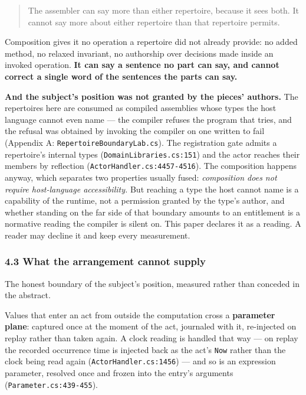 \documentclass[
]{article}
\begin{document}
\begin{quote}
The assembler can say more than either repertoire, because it sees both.
It cannot say more about either repertoire than that repertoire permits.
\end{quote}

Composition gives it no operation a repertoire did not already provide:
no added method, no relaxed invariant, no authorship over decisions made
inside an invoked operation. \textbf{It can say a sentence no part can
say, and cannot correct a single word of the sentences the parts can
say.}

\textbf{And the subject's position was not granted by the pieces'
authors.} The repertoires here are consumed as compiled assemblies whose
types the host language cannot even name --- the compiler refuses the
program that tries, and the refusal was obtained by invoking the
compiler on one written to fail (Appendix A:
\texttt{RepertoireBoundaryLab.cs}). The registration gate admits a
repertoire's internal types (\texttt{DomainLibraries.cs:151}) and the
actor reaches their members by reflection
(\texttt{ActorHandler.cs:4457-4516}). The composition happens anyway,
which separates two properties usually fused: \emph{composition does not
require host-language accessibility.} But reaching a type the host
cannot name is a capability of the runtime, not a permission granted by
the type's author, and whether standing on the far side of that boundary
amounts to an entitlement is a normative reading the compiler is silent
on. This paper declares it as a reading. A reader may decline it and
keep every measurement.

\subsubsection{4.3 What the arrangement cannot
supply}\label{what-the-arrangement-cannot-supply}

The honest boundary of the subject's position, measured rather than
conceded in the abstract.

Values that enter an act from outside the computation cross a
\textbf{parameter plane}: captured once at the moment of the act,
journaled with it, re-injected on replay rather than taken again. A
clock reading is handled that way --- on replay the recorded occurrence
time is injected back as the act's \texttt{Now} rather than the clock
being read again (\texttt{ActorHandler.cs:1456}) --- and so is an
expression parameter, resolved once and frozen into the entry's
arguments (\texttt{Parameter.cs:439-455}).
\end{document}
